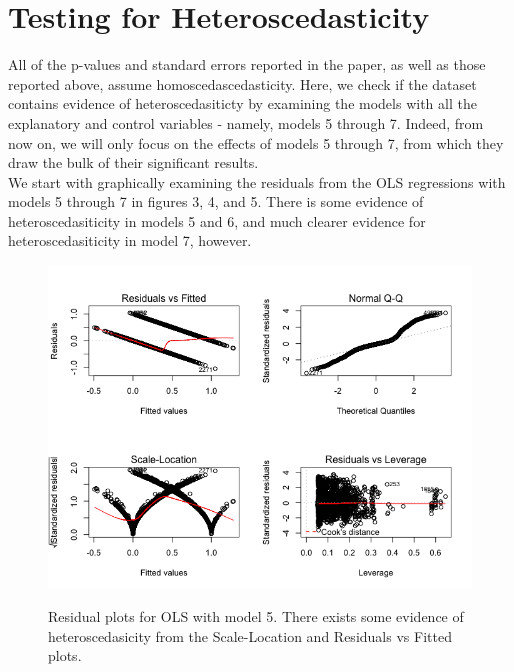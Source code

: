 \documentclass{article}
\begin{document}
\section{Testing for Heteroscedasticity}
All of the p-values and standard errors reported in the paper, as well as those reported above, assume homoscedascedasticity. Here, we check if the dataset contains evidence of heteroscedasiticty by examining the models with all the explanatory and control variables - namely, models 5 through 7. Indeed, from now on, we will only focus on the effects of models 5 through 7, from which they draw the bulk of their significant results. \\

We start with graphically examining the residuals from the OLS regressions with models 5 through 7 in figures 3, 4, and 5. There is some evidence of heteroscedasiticity in models 5 and 6, and much clearer evidence for  heteroscedasiticity in model 7, however. \\
 
 \begin{figure}
\centering
\includegraphics[scale=0.5]{model5Resid}
\label{model5resid}
\caption{Residual plots for OLS with model 5. There exists some evidence of heteroscedasicity from the Scale-Location and Residuals vs Fitted plots.}
\end{figure}
\end{document}
